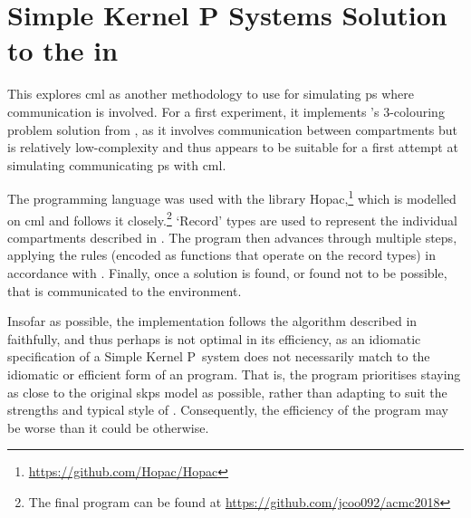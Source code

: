 \section[Simple Kernel P Systems Solution to the \glsfmtname{gcp-glossary} in \glsfmtname{cml-glossary}][\Gls{skps} Solution to the \gls{gcp} in \gls{cml}]{\label{sec:gcol:cml}Simple Kernel P Systems Solution to the  in }

This  explores \gls{cml} as another methodology to use for simulating \gls{ps} where communication is involved.  For a first experiment, it implements \citeauthor{Gheorghe2013}'s 3-colouring problem solution from \cite{Gheorghe2013}, as it involves communication between compartments but is relatively low-complexity and thus appears to be suitable for a first attempt at simulating communicating \gls{ps} with \gls{cml}.

The programming language \fsharp{} was used with the library Hopac,\footnote{\url{https://github.com/Hopac/Hopac}} which is modelled on \gls{cml} and follows it closely.\footnote{The final program can be found at \url{https://github.com/jcoo092/acmc2018}}  `Record' types are used to represent the individual compartments described in \cite{Gheorghe2013}.  The program then advances through multiple steps, applying the rules (encoded as functions that operate on the record types) in accordance with \cite{Gheorghe2013}.  Finally, once a solution is found, or found not to be possible, that is communicated to the environment.

Insofar as possible, the implementation follows the algorithm described in \cite{Gheorghe2013} faithfully, and thus perhaps is not optimal in its efficiency, as an idiomatic specification of a Simple Kernel P~system does not necessarily match to the idiomatic or efficient form of an \fsharp{} program.  That is, the program prioritises staying as close to the original \gls{skps} model as possible, rather than adapting to suit the strengths and typical style of \fsharp{}.  Consequently, the efficiency of the program may be worse than it could be otherwise.


